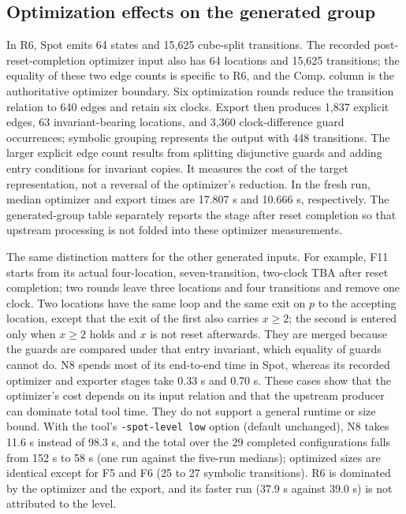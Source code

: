 \subsection{Optimization effects on the generated group}
In R6, Spot emits 64 states and 15,625 cube-split transitions. The recorded
post-reset-completion optimizer input also has 64 locations and 15,625
transitions; the equality of these two edge counts is specific to R6, and the
Comp. column is the authoritative optimizer boundary. Six optimization
rounds reduce the transition relation to 640 edges and retain six clocks.
Export then produces 1,837 explicit edges, 63 invariant-bearing locations,
and 3,360 clock-difference guard occurrences; symbolic grouping represents
the output with 448 transitions. The larger explicit edge count results from
splitting disjunctive guards and adding entry conditions for invariant copies.
It measures the cost of the target representation, not a reversal of the
optimizer's reduction. In the fresh run, median optimizer and export times
are 17.807 s and 10.666 s, respectively. The generated-group table separately reports the
stage after reset completion so that upstream processing is not folded into
these optimizer measurements.

The same distinction matters for the other generated inputs. For example,
F11 starts from its actual four-location, seven-transition, two-clock TBA
after reset completion; two rounds leave three locations and four
transitions and remove one clock. Two locations have the same loop and the
same exit on $p$ to the accepting location, except that the exit of the first
also carries $x\ge2$; the second is entered only when $x\ge2$ holds and $x$ is
not reset afterwards. They are merged because the guards are compared under
that entry invariant, which equality of guards cannot do. N8 spends most of its end-to-end time in Spot,
whereas its recorded optimizer and exporter stages take 0.33 s and 0.70 s.
These cases show that the optimizer's cost depends on its input relation and
that the upstream producer can dominate total tool time. They do not support
a general runtime or size bound. With the tool's \texttt{-spot-level low}
option (default unchanged), N8 takes 11.6 s instead of 98.3 s, and the total
over the 29 completed configurations falls from 152 s to 58 s (one run
against the five-run medians); optimized sizes are identical except for F5
and F6 (25 to 27 symbolic transitions). R6 is dominated by the optimizer and
the export, and its faster run (37.9 s against 39.0 s) is not attributed to
the level.


